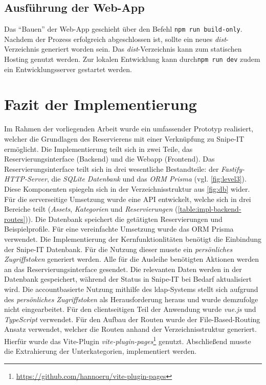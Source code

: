 \subsection{Ausführung der Web-App}
Das \enquote{Bauen} der Web-App geschieht über den Befehl \lstinline{npm run build-only}. Nachdem
der Prozess erfolgreich abgeschlossen ist, sollte ein neues \textit{dist}-Verzeichnis generiert
worden sein. Das \textit{dist}-Verzeichnis kann zum statischen Hosting genutzt werden. Zur lokalen
Entwicklung kann durch\lstinline{npm run dev} zudem ein Entwicklungsserver gestartet werden.

\section{Fazit der Implementierung}

Im Rahmen der vorliegenden Arbeit wurde ein umfassender Prototyp realisiert, welcher die Grundlagen
des Reservierens mit einer Verknüpfung zu Snipe-IT ermöglicht. Die Implementierung teilt sich in
zwei Teile, das Reservierungsinterface (Backend) und die Webapp (Frontend). Das
Reservierungsinterface teilt sich in drei wesentliche Bestandteile: der
\textit{Fastify-HTTP-Server}, die \textit{SQLite Datenbank} und das \textit{ORM Prisma} (vgl.
\ref{fig:level3}). Diese Komponenten spiegeln sich in der Verzeichnisstruktur aus \ref{fig:db}
wider. Für die serverseitige Umsetzung wurde eine API entwickelt, welche sich in drei Bereiche teilt
(\textit{Assets}, \textit{Kategorien} und \textit{Reservierungen}
(\ref{table:impl-backend-routes})). Die Datenbank speichert die getätigten Reservierungen und
Beispielprofile. Für eine vereinfachte Umsetzung wurde das ORM Prisma verwendet. Die Implementierung
der Kernfunktionlitäten benötigt die Einbindung der Snipe-IT Datenbank. Für die Nutzung dieser
musste ein \textit{persönliches Zugriffstoken} generiert werden. Alle für die Ausleihe benötigten
Aktionen werden an das Reservierungsinterface gesendet. Die relevanten Daten werden in der Datenbank
gespeichert, während der Status in Snipe-IT bei Bedarf aktualisiert wird. Die accountbasierte
Nutzung mithilfe des \ac{ldap}-Systems stellt sich aufgrund des \textit{persönliches Zugriffstoken}
als Herausforderung heraus und wurde demzufolge nicht eingearbeitet. Für den clientseitigen Teil der
Anwendung wurde \textit{vue.js} und \textit{TypeScript} verwendet. Für den Aufbau der Routen wurde
der File-Based-Routing Ansatz verwendet, welcher die Routen anhand der Verzeichnisstruktur
generiert. Hierfür wurde das Vite-Plugin
\textit{vite-plugin-pages}\footnote{\url{https://github.com/hannoeru/vite-plugin-pages}} genutzt.
Abschließend musste die Extrahierung der Unterkategorien, implementiert werden.